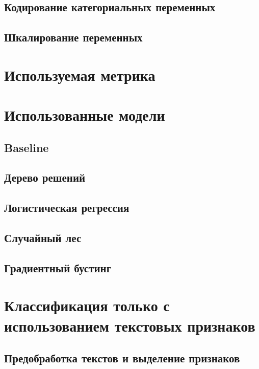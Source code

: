 \documentclass[14pt]{mmcs_article}
\begin{document}
\subsection{Кодирование категориальных переменных}

\subsection{Шкалирование переменных}

\newpage
\section{Используемая метрика}

\newpage
\section{Использованные модели}

\subsection{Baseline}

\subsection{Дерево решений}

\subsection{Логистическая регрессия}

\subsection{Случайный лес}

\subsection{Градиентный бустинг}

\newpage
\section{Классификация только с использованием текстовых признаков}

\subsection{Предобработка текстов и выделение признаков}
\end{document}
